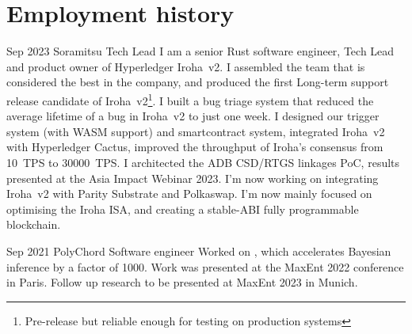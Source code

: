 \documentclass{CurriculumVitae}[10pt, condensed]
\begin{document}
\section*{Employment history} {%
  \setlength{\parindent}{0in}%

  {Sep 2023}%
  {Soramitsu}%
  {Tech Lead}%
  {I am a senior Rust software engineer, Tech Lead and product owner
    of Hyperledger Iroha~v2.  I assembled the team that is considered
    the best in the company, and produced the first Long-term support
    release candidate of Iroha~v2\footnote{Pre-release but reliable
      enough for testing on production systems}. I built a bug triage
    system that reduced the average lifetime of a bug in Iroha~v2 to
    just one week. I designed our trigger system (with WASM support)
    and smartcontract system, integrated Iroha~v2 with Hyperledger
    Cactus, improved the throughput of Iroha's consensus from 10~TPS
    to 30000~TPS. I architected the ADB CSD/RTGS linkages PoC, results
    presented at the Asia Impact Webinar 2023.  I'm now working on
    integrating Iroha~v2 with Parity Substrate and Polkaswap.  I'm now
    mainly focused on optimising the Iroha ISA, and creating a
    stable-ABI fully programmable blockchain. }%

  {Sep 2021}%
  {PolyChord}%
  {Software engineer}%
  { Worked on , which accelerates Bayesian inference
    by a factor of 1000. Work was presented at the MaxEnt 2022
    conference in Paris. Follow up research to be presented at MaxEnt
    2023 in Munich. }

  
  
\begin{comment}
  \job{Jul 2020}{Oct 2020} {Cambridge DAMTP} {QA intern} {Designed a
    neural network for vetting the applicability of the NHSx X-ray
    data for automated diagnosis of COVID-19, which was comparable in
    precision, but required 5--6 times less processing power.  }
\end{comment}
  
\begin{comment}
  \job{Jul 2018}{Oct 2018} {Cambridge University Computer Lab}
  {Software Development Intern} {Designed, and improved a dynamic road
    network All-pairs shortest path solver, using a highly
    paralleliseable graph traversal framework, which improved
    performance by a factor of 50.  }
\end{comment}
  
\begin{comment}
  \job{Jan 2013}{May 2015}  {Masterlagebra.org} {Backend Developer}
  {Designed and implemented problems for university level automated
    linear algebra training program. Problems were related to complex
    numbers, Gram-Schmidt ortho-normalisation process, analytical geometry
    problems involving planes and lines in higher dimensions.
  }
\end{comment}
  
}
\end{document}
